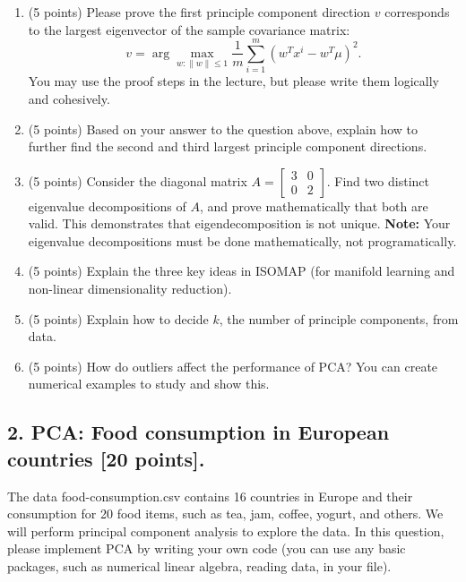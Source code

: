 \documentclass[twoside,10pt]{article}
\begin{document}
\begin{enumerate}

\item (5 points) Please prove the first principle component direction $v$ corresponds to the largest eigenvector of the sample covariance matrix:
\[
v = \arg\max_{w: \|w\|\leq 1} \frac 1 m \sum_{i=1}^m (w^T x^i - w^T \mu)^2.
\]
You may use the proof steps in the lecture, but please write them logically and cohesively.

\item (5 points) Based on your answer to the question above, explain how to further find the second and third largest principle component directions.

\item (5 points) 
Consider the diagonal matrix \( A = \begin{bmatrix} 3 & 0 \\ 0 & 2 \end{bmatrix} \).  
Find two distinct eigenvalue decompositions of \( A \), and prove mathematically that both are valid. This demonstrates that eigendecomposition is not unique. \textbf{Note:} Your eigenvalue decompositions must be done mathematically, not programatically.

\item (5 points) Explain the three key ideas in ISOMAP (for manifold learning and non-linear dimensionality reduction). 

\item (5 points) Explain how to decide $k$, the number of principle components, from data. 

\item (5 points) How do outliers affect the performance of PCA? You can create numerical examples to study and show this.

\end{enumerate}


\clearpage

\subsection*{2. PCA: Food consumption in European countries [20 points].}

The data \textsf{food-consumption.csv} contains 16 countries in Europe and their consumption for 20 food items, such as tea, jam, coffee, yogurt, and others. We will perform principal component analysis to explore the data. In this question, please implement PCA by writing your own code (you can use any basic packages, such as numerical linear algebra, reading data, in your file).
\end{document}
